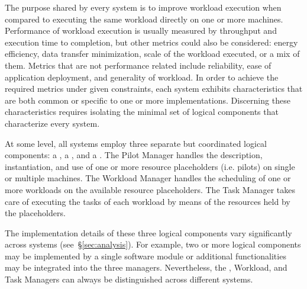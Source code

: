 \documentclass{sig-alternate}
\begin{document}
The purpose shared by every \pilotjob system is to improve workload execution
when compared to executing the same workload directly on one or more machines.
Performance of workload execution is usually measured by throughput and
execution time to completion, but other metrics could also be considered: energy
efficiency, data transfer minimization, scale of the workload executed, or a mix
of them. Metrics that are not performance related include reliability, ease of
application deployment, and generality of workload. In order to achieve the
required metrics under given constraints, each \pilotjob system exhibits
characteristics that are both common or specific to one or more implementations.
Discerning these characteristics requires isolating the minimal set of logical
components that characterize every \pilotjob system.

At some level, all \pilotjob systems employ three separate but coordinated
logical components: a , a , and a
. The Pilot Manager handles the description, instantiation,
and use of one or more resource placeholders (i.e. pilots) on single or multiple
machines. The Workload Manager handles the scheduling of one or more workloads
on the available resource placeholders. The Task Manager takes care of executing
the tasks of each workload by means of the resources held by the placeholders.

The implementation details of these three logical components vary significantly
across \pilotjob systems (see~\S\ref{sec:analysis}). For example, two or more
logical components may be implemented by a single software module or additional
functionalities may be integrated into the three managers. Nevertheless, the
\pilot, Workload, and Task Managers can always be distinguished across different
\pilotjob systems.


\end{document}
